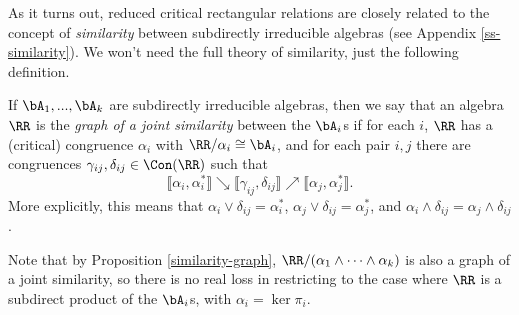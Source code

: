 As it turns out, reduced critical rectangular relations are closely related to the concept of \emph{similarity} between subdirectly irreducible algebras (see Appendix \ref{ss-similarity}). We won't need the full theory of similarity, just the following definition.

\begin{defn} If $\bA_1, ..., \bA_k$ are subdirectly irreducible algebras, then we say that an algebra $\RR$ is the \emph{graph of a joint similarity} between the $\bA_i$s if for each $i$, $\RR$ has a (critical) congruence $\alpha_i$ with $\RR/\alpha_i \cong \bA_i$, and for each pair $i,j$ there are congruences $\gamma_{ij}, \delta_{ij} \in \Con(\RR)$ such that
\[
\llbracket \alpha_i, \alpha_i^* \rrbracket \searrow \llbracket \gamma_{ij}, \delta_{ij} \rrbracket \nearrow \llbracket \alpha_j, \alpha_j^*\rrbracket.
\]
More explicitly, this means that $\alpha_i \vee \delta_{ij} = \alpha_i^*$, $\alpha_j \vee \delta_{ij} = \alpha_j^*$, and $\alpha_i \wedge \delta_{ij} = \alpha_j \wedge \delta_{ij}$.

Note that by Proposition \ref{similarity-graph}, $\RR/(\alpha_1 \wedge \cdots \wedge \alpha_k)$ is also a graph of a joint similarity, so there is no real loss in restricting to the case where $\RR$ is a subdirect product of the $\bA_i$s, with $\alpha_i = \ker \pi_i$.
\end{defn}

